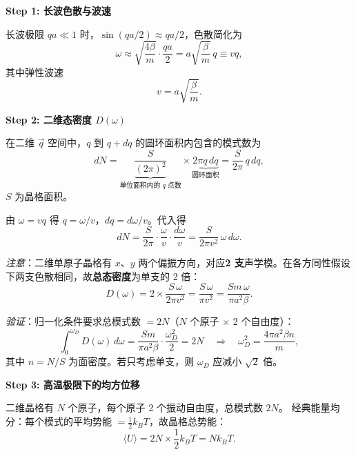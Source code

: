 \begin{derivationbox}[标准解题过程]
\textbf{Step 1: 长波色散与波速}

长波极限 $qa\ll1$ 时，$\sin(qa/2)\approx qa/2$，色散简化为
\begin{equation}
\omega \approx \sqrt{\frac{4\beta}{m}}\cdot\frac{qa}{2} = a\sqrt{\frac{\beta}{m}}\,q \equiv vq,
\end{equation}
其中弹性波速
\begin{equation}
\boxed{v = a\sqrt{\frac{\beta}{m}}.}
\end{equation}

\textbf{Step 2: 二维态密度 $D(\omega)$}

在二维 $\vec q$ 空间中，$q$ 到 $q+dq$ 的圆环面积内包含的模式数为
\begin{equation}
dN = \underbrace{\frac{S}{(2\pi)^2}}_{\text{单位面积内的 }q\text{ 点数}} \times \underbrace{2\pi q\,dq}_{\text{圆环面积}} = \frac{S}{2\pi}\,q\,dq,
\end{equation}
$S$ 为晶格面积。

由 $\omega=vq$ 得 $q=\omega/v$，$dq=d\omega/v$。代入得
\begin{equation}
dN = \frac{S}{2\pi}\cdot\frac{\omega}{v}\cdot\frac{d\omega}{v} = \frac{S}{2\pi v^2}\,\omega\,d\omega.
\end{equation}

\textit{注意}：二维单原子晶格有 $x$、$y$ 两个偏振方向，对应\textbf{2 支}声学模。在各方同性假设下两支色散相同，故\textbf{总态密度}为单支的 2 倍：
\begin{equation}
\boxed{D(\omega) = 2\times\frac{S\,\omega}{2\pi v^2} = \frac{S\,\omega}{\pi v^2} = \frac{Sm\,\omega}{\pi a^2\beta}.}
\label{eq:2d-dos}
\end{equation}

\textit{验证}：归一化条件要求总模式数 $=2N$（$N$ 个原子 $\times$ 2 个自由度）：
\begin{equation}
\int_0^{\omega_D} D(\omega)\,d\omega = \frac{Sm}{\pi a^2\beta}\cdot\frac{\omega_D^2}{2} = 2N \quad\Longrightarrow\quad \omega_D^2 = \frac{4\pi a^2\beta n}{m},
\end{equation}
其中 $n=N/S$ 为面密度。若只考虑单支，则 $\omega_D$ 应减小 $\sqrt{2}$ 倍。

\textbf{Step 3: 高温极限下的均方位移}

二维晶格有 $N$ 个原子，每个原子 2 个振动自由度，总模式数 $2N$。
经典能量均分：每个模式的平均势能 $= \frac12 k_BT$，故晶格总势能：
\begin{equation}
\langle U\rangle = 2N \times \frac12 k_BT = Nk_BT.
\label{eq:total-potential-2d}
\end{equation}


\end{derivationbox}
